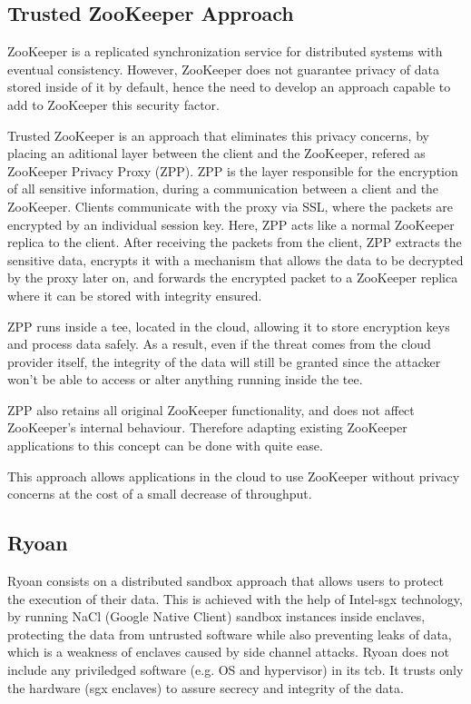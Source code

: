 \subsection{Trusted ZooKeeper Approach}
\label{ssec:protected_zookeeper}

ZooKeeper \cite{zookeeper} is a replicated synchronization service for distributed systems with eventual consistency. However, ZooKeeper does not guarantee privacy of data stored inside of it by default, hence the need to develop an approach capable to add to ZooKeeper this security factor.

Trusted ZooKeeper \cite{protectedZooKeeper} is an approach that eliminates this privacy concerns, by placing an aditional layer between the client and the ZooKeeper, refered as ZooKeeper Privacy Proxy (ZPP). ZPP is the layer responsible for the encryption of all sensitive information, during a communication between a client and the ZooKeeper. 
Clients communicate with the proxy via SSL, where the packets are encrypted by an individual session key. Here, ZPP acts like a normal ZooKeeper replica to the client. 
After receiving the packets from the client, ZPP extracts the sensitive data, encrypts it with a mechanism that allows the data to be decrypted by the proxy later on, and forwards the encrypted packet to a ZooKeeper replica where it can be stored with integrity ensured.

ZPP runs inside a \gls{tee}, located in the cloud, allowing it to store encryption keys and process data safely. As a result, even if the threat comes from the cloud provider itself, the integrity of the data will still be granted since the attacker won't be able to access or alter anything running inside the \gls{tee}.

ZPP also retains all original ZooKeeper functionality, and does not affect ZooKeeper's internal behaviour. Therefore adapting existing ZooKeeper applications to this concept can be done with quite ease.

This approach allows applications in the cloud to use ZooKeeper without privacy concerns at the cost of a small decrease of throughput.
\subsection{Ryoan}
\label{ssec:ryoan_sandboxing}

Ryoan \cite{ryoanPaper} consists on a distributed sandbox approach that allows users to protect the execution of their data. This is achieved with the help of Intel-\gls{sgx} \cite{intelSGX} \cite{sgxPaper} technology, by running NaCl (Google Native Client) sandbox instances inside enclaves, protecting the data from untrusted software while also preventing leaks of data, which is a weakness of enclaves caused by side channel attacks.
Ryoan does not include any priviledged software (e.g. OS and hypervisor) in its \gls{tcb}. It trusts only the hardware (\gls{sgx} enclaves) to assure secrecy and integrity of the data.

